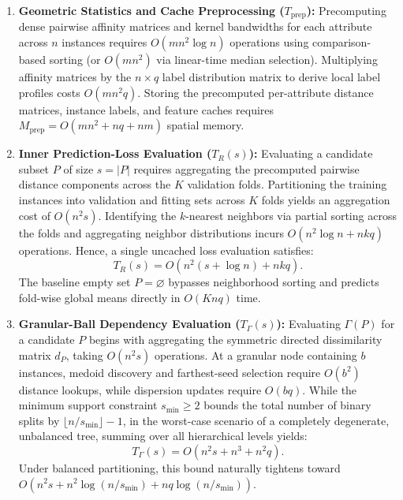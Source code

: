 \begin{enumerate}[label=(\roman*)]
	\item \textbf{Geometric Statistics and Cache Preprocessing ($T_{\mathrm{prep}}$):}
	Precomputing dense pairwise affinity matrices and kernel bandwidths for each attribute across $n$ instances requires $O(m n^2 \log n)$ operations using comparison-based sorting (or $O(m n^2)$ via linear-time median selection). Multiplying affinity matrices by the $n \times q$ label distribution matrix to derive local label profiles costs $O(m n^2 q)$. Storing the precomputed per-attribute distance matrices, instance labels, and feature caches requires $M_{\mathrm{prep}} = O(m n^2 + n q + n m)$ spatial memory.
	
	\item \textbf{Inner Prediction-Loss Evaluation ($T_R(s)$):}
	Evaluating a candidate subset $P$ of size $s = |P|$ requires aggregating the precomputed pairwise distance components across the $K$ validation folds. Partitioning the training instances into validation and fitting sets across $K$ folds yields an aggregation cost of $O(n^2 s)$. Identifying the $k$-nearest neighbors via partial sorting across the folds and aggregating neighbor distributions incurs $O(n^2 \log n + n k q)$ operations. Hence, a single uncached loss evaluation satisfies:
	\begin{equation}
		T_R(s) = O\left(n^2(s + \log n) + n k q\right).
		\label{eq:eval-loss-complexity}
	\end{equation}
	The baseline empty set $P = \varnothing$ bypasses neighborhood sorting and predicts fold-wise global means directly in $O(K n q)$ time.
	
	\item \textbf{Granular-Ball Dependency Evaluation ($T_\Gamma(s)$):}
	Evaluating $\Gamma(P)$ for a candidate $P$ begins with aggregating the symmetric directed dissimilarity matrix $d_P$, taking $O(n^2 s)$ operations. At a granular node containing $b$ instances, medoid discovery and farthest-seed selection require $O(b^2)$ distance lookups, while dispersion updates require $O(b q)$. While the minimum support constraint $s_{\min} \ge 2$ bounds the total number of binary splits by $\lfloor n/s_{\min} \rfloor - 1$, in the worst-case scenario of a completely degenerate, unbalanced tree, summing over all hierarchical levels yields:
	\begin{equation}
		T_\Gamma(s) = O\left(n^2 s + n^3 + n^2 q\right).
		\label{eq:eval-gamma-complexity}
	\end{equation}
	Under balanced partitioning, this bound naturally tightens toward $O(n^2 s + n^2 \log(n/s_{\min}) + n q \log(n/s_{\min}))$.
\end{enumerate}

